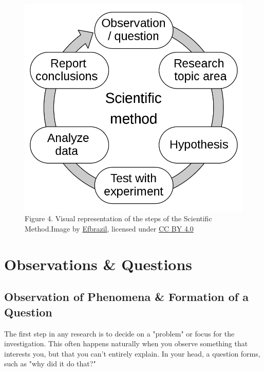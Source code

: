 \documentclass[
]{book}
\begin{document}
\begin{figure}
\centering
\includegraphics{figures_images/Lab2b-Fig1.png}
\caption{Figure 4. Visual representation of the steps of the Scientific Method.Image by \href{https://commons.wikimedia.org/wiki/File:The_Scientific_Method.svg}{Efbrazil}, licensed under \href{https://creativecommons.org/licenses/by/4.0/}{CC BY 4.0}}
\end{figure}

\hypertarget{observations-questions}{%
\section*{Observations \& Questions}\label{observations-questions}}

\hypertarget{observation-of-phenomena-formation-of-a-question}{%
\subsection*{Observation of Phenomena \& Formation of a Question}\label{observation-of-phenomena-formation-of-a-question}}

The first step in any research is to decide on a "problem" or focus for the investigation. This often happens naturally when you observe something that interests you, but that you can't entirely explain. In your head, a question forms, such as "why did it do that?"
\end{document}
